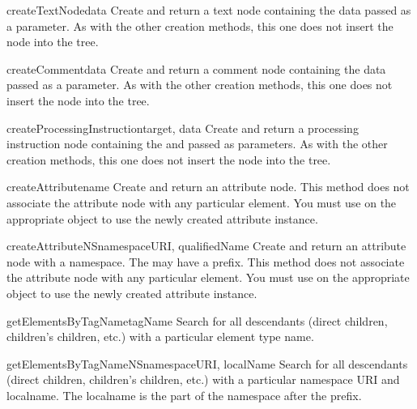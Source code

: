 \begin{methoddesc}[Document]{createTextNode}{data}
Create and return a text node containing the data passed as a
parameter.  As with the other creation methods, this one does not
insert the node into the tree.
\end{methoddesc}

\begin{methoddesc}[Document]{createComment}{data}
Create and return a comment node containing the data passed as a
parameter.  As with the other creation methods, this one does not
insert the node into the tree.
\end{methoddesc}

\begin{methoddesc}[Document]{createProcessingInstruction}{target, data}
Create and return a processing instruction node containing the
 and  passed as parameters.  As with the other
creation methods, this one does not insert the node into the tree.
\end{methoddesc}

\begin{methoddesc}[Document]{createAttribute}{name}
Create and return an attribute node.  This method does not associate
the attribute node with any particular element.  You must use
 on the appropriate  object
to use the newly created attribute instance.
\end{methoddesc}

\begin{methoddesc}[Document]{createAttributeNS}{namespaceURI, qualifiedName}
Create and return an attribute node with a namespace.  The
 may have a prefix.  This method does not associate the
attribute node with any particular element.  You must use
 on the appropriate  object
to use the newly created attribute instance.
\end{methoddesc}

\begin{methoddesc}[Document]{getElementsByTagName}{tagName}
Search for all descendants (direct children, children's children,
etc.) with a particular element type name.
\end{methoddesc}

\begin{methoddesc}[Document]{getElementsByTagNameNS}{namespaceURI, localName}
Search for all descendants (direct children, children's children,
etc.) with a particular namespace URI and localname.  The localname is
the part of the namespace after the prefix.
\end{methoddesc}


